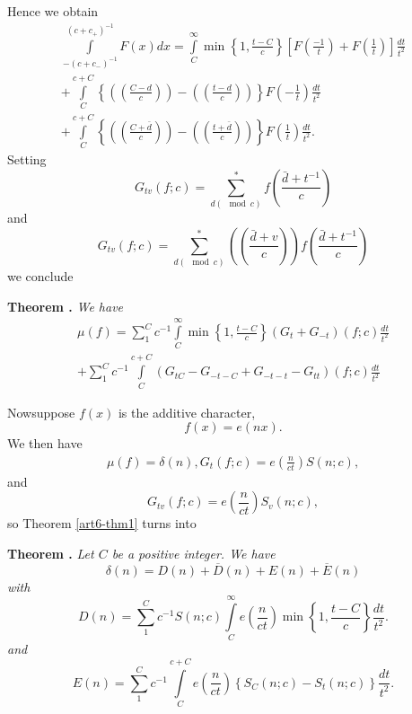 Hence we obtain
\begin{gather*}
\int\limits^{(c+c_+)^{-1}}_{-(c+c_-)^{-1}} F (x) dx = \int\limits^\infty_C \min \left\{1, \frac{t-C}{c} \right\} \left[F\left(\frac{-1}{t}\right)  + F \left(\frac{1}{t}\right) \right] \frac{dt}{t^2}\\
+ \int\limits^{c+C}_C \left\{\left(\left(\frac{C-d}{c} \right) \right)  - \left(\left(\frac{t-d}{c} \right) \right)\right\} F \left(-\frac{1}{t} \right) \frac{dt}{t^2}\\
+ \int\limits^{c+C}_C \left\{\left(\left(\frac{C+\bar{d}}{c} \right) \right) - \left(\left(\frac{t+\bar{d}}{c} \right) \right) \right\} F \left(\frac{1}{t} \right) \frac{dt}{t^2}.
\end{gather*}
Setting
$$
G_{tv} (f;c) = \sum\limits^\ast_{d(\mod c)} f\left(\frac{\bar{d} +t^{-1}}{c} \right)
$$
and 
$$
G_{tv} (f;c) =\sum\limits^\ast_{d(\mod c)} \left(\left(\frac{\bar{d} + v}{c} \right) \right) f \left(\frac{\bar{d} + t^{-1}}{c} \right)
$$
we conclude

\medskip
\noindent
{\bfseries Theorem .\label{art6-thm1}}
\textit{We have }
\begin{gather*}
\mu(f) =\sum\limits^C_1 c^{-1} \int\limits^\infty_C \min \left\{1,\frac{t-C}{c} \right\} (G_t+ G_{-t}) (f;c) \frac{dt}{t^2}\\
+ \sum\limits^C_1 c^{-1} \int\limits^{c+C}_C (G_{tC} - G_{-t-C} + G_{-t-t} - G_{tt}) (f;c) \frac{dt}{t^2}
\end{gather*}

Now\pageoriginale suppose $f(x)$ is the additive character,
$$
f(x) = e(nx).
$$
We then have 
\begin{gather*}
\mu(f) = \delta (n),
G_t (f;c) = e \left(\frac{n}{ct} \right) S (n; c),
\end{gather*}
and 
$$
G_{tv} (f;c) = e \left(\frac{n}{ct} \right) S_v (n;c),
$$
so Theorem \ref{art6-thm1} turns into 

\medskip
\noindent
{\bfseries Theorem .\label{art6-thm2}}
\textit{Let $C$ be a positive integer. We have }
$$
\delta (n) = D (n) + \overline{D} (n) + E (n) +\overline{E} (n)
$$
\textit{with }
$$
D(n) = \sum\limits^C_1 c^{-1} S (n;c) \int\limits^\infty_C e \left(\frac{n}{ct} \right) \min \left\{1, \frac{t-C}{c} \right\} \frac{dt}{t^2}. 
$$
\textit{and }
$$
E(n) = \sum\limits^C_1 c^{-1} \int\limits^{c+C}_C  e \left(\frac{n}{ct} \right) \left\{ S_C (n;c) - S_t (n;c)\right\} \frac{dt}{t^2}.
$$

